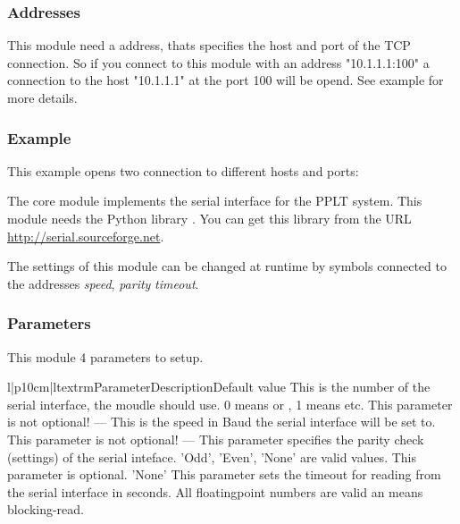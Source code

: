 \subsubsection{Addresses}
This module need a address, thats specifies the host and port of the TCP 
connection. So if you connect to this module with an address "10.1.1.1:100"
a connection to the host "10.1.1.1" at the port 100 will be opend. See 
example for more details.  

\subsubsection{Example}
This example opens two connection to different hosts and ports:




%
%
The  core module implements the serial
interface for the PPLT system. This module needs the Python library 
. You can get this library from the URL 
\url{http://serial.sourceforge.net}. 

The settings of this module can be changed at runtime by symbols connected to
the addresses \emph{speed}, \emph{parity} \emph{timeout}.

\subsubsection{Parameters}
This module 4 parameters to setup. 
\begin{tableiii}{l|p{10cm}|l}{textrm}{Parameter}{Description}{Default value}
        {This is the number of the serial interface, the moudle should use. 0 
         means  or , 1 means  etc. This
         parameter is not optional!}
        {---}
        {This is the speed in Baud the serial interface will be set to. This
         parameter is not optional!} 
        {---}
        {This parameter specifies the parity check (settings) of the serial 
         inteface. 'Odd', 'Even', 'None' are valid values. This parameter
         is optional.}
        {'None'}
        {This parameter sets the timeout for reading from the serial 
         interface in seconds. All floatingpoint numbers are valid an
          means blocking-read.}
        {}
\end{tableiii}


